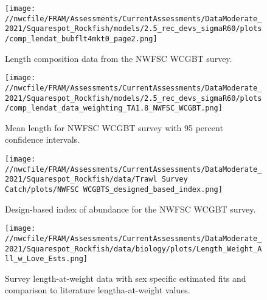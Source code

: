 \documentclass[11pt,
  english,
  a4paper,
]{article}
\begin{document}

\begin{figure}
\centering
\texttt{[image: //nwcfile/FRAM/Assessments/CurrentAssessments/DataModerate\_2021/Squarespot\_Rockfish/models/2.5\_rec\_devs\_sigmaR60/plots/comp\_lendat\_bubflt4mkt0\_page2.png]}
\caption{Length composition data from the NWFSC WCGBT survey.\label{fig:wcgbts-len-data}}
\end{figure}

\tagmcend\tagstructend


\begin{figure}
\centering
\texttt{[image: //nwcfile/FRAM/Assessments/CurrentAssessments/DataModerate\_2021/Squarespot\_Rockfish/models/2.5\_rec\_devs\_sigmaR60/plots/comp\_lendat\_data\_weighting\_TA1.8\_NWFSC\_WCGBT.png]}
\caption{Mean length for NWFSC WCGBT survey with 95 percent confidence intervals.\label{fig:wcgbts-mean-len-data}}
\end{figure}

\tagmcend\tagstructend


\begin{figure}
\centering
\texttt{[image: //nwcfile/FRAM/Assessments/CurrentAssessments/DataModerate\_2021/Squarespot\_Rockfish/data/Trawl Survey Catch/plots/NWFSC WCGBTS\_designed\_based\_index.png]}
\caption{Design-based index of abundance for the NWFSC WCGBT survey.\label{fig:wcgbts-dbindex}}
\end{figure}

\tagmcend\tagstructend


\begin{figure}
\centering
\texttt{[image: //nwcfile/FRAM/Assessments/CurrentAssessments/DataModerate\_2021/Squarespot\_Rockfish/data/biology/plots/Length\_Weight\_All\_w\_Love\_Ests.png]}
\caption{Survey length-at-weight data with sex specific estimated fits and comparison to literature lengtha-at-weight values.\label{fig:len-weight}}
\end{figure}
\end{document}
